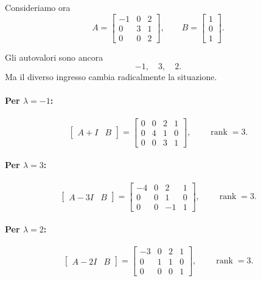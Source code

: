 Consideriamo ora
\begin{equation}
A=
\begin{bmatrix}
-1 & 0 & 2\\
0 & 3 & 1\\
0 & 0 & 2
\end{bmatrix},
\qquad
B=
\begin{bmatrix}
1\\
0\\
1
\end{bmatrix}.
\label{eq:L13_es4}
\end{equation}

Gli autovalori sono ancora
\[
-1,\quad 3,\quad 2.
\]
Ma il diverso ingresso cambia radicalmente la situazione.

\paragraph{Per \(\lambda=-1\):}
\[
\begin{bmatrix}
A+I & B
\end{bmatrix}
=
\begin{bmatrix}
0 & 0 & 2 & 1\\
0 & 4 & 1 & 0\\
0 & 0 & 3 & 1
\end{bmatrix},
\qquad
\operatorname{rank}=3.
\]

\paragraph{Per \(\lambda=3\):}
\[
\begin{bmatrix}
A-3I & B
\end{bmatrix}
=
\begin{bmatrix}
-4 & 0 & 2 & 1\\
0 & 0 & 1 & 0\\
0 & 0 & -1 & 1
\end{bmatrix},
\qquad
\operatorname{rank}=3.
\]

\paragraph{Per \(\lambda=2\):}
\[
\begin{bmatrix}
A-2I & B
\end{bmatrix}
=
\begin{bmatrix}
-3 & 0 & 2 & 1\\
0 & 1 & 1 & 0\\
0 & 0 & 0 & 1
\end{bmatrix},
\qquad
\operatorname{rank}=3.
\]

